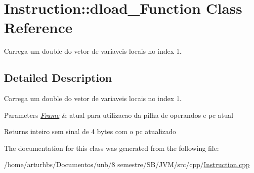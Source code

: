 \hypertarget{classInstruction_1_1dload__1Function}{}\section{Instruction\+:\+:dload\+\_\+Function Class Reference}
\label{classInstruction_1_1dload__1Function}


Carrega um double do vetor de variaveis locais no index 1.  




\subsection{Detailed Description}
Carrega um double do vetor de variaveis locais no index 1. 


\begin{DoxyParams}{Parameters}
{\em \hyperlink{classFrame}{Frame}} & atual para utilizacao da pilha de operandos e pc atual \\
\hline
\end{DoxyParams}
\begin{DoxyReturn}{Returns}
inteiro sem sinal de 4 bytes com o pc atualizado 
\end{DoxyReturn}


The documentation for this class was generated from the following file\+:\begin{DoxyCompactItemize}
\item 
/home/arturhbs/\+Documentos/unb/8 semestre/\+S\+B/\+J\+V\+M/src/cpp/\hyperlink{Instruction_8cpp}{Instruction.\+cpp}\end{DoxyCompactItemize}
